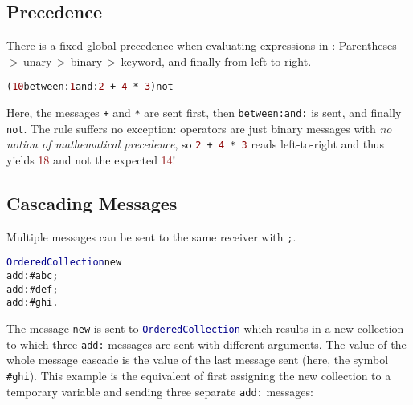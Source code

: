 \subsection{Precedence}

There is a fixed global precedence when evaluating expressions in \PH: Parentheses\,$>$\,unary\,$>$\,binary\,$>$\,keyword, and finally from left to right.

\begin{alltt}
(\textcolor{darkRed}{10} between: \textcolor{darkRed}{1} and: \textcolor{darkRed}{2}\,+\,\textcolor{darkRed}{4}\,*\,\textcolor{darkRed}{3}) not
\end{alltt}

Here, the messages \texttt{+} and \texttt{*} are sent first, then \texttt{between:and:} is sent, and finally \texttt{not}.
The rule suffers no exception: operators are just binary messages with \emph{no notion of mathematical precedence}, so \texttt{\textcolor{darkRed}{2}\,+\,\textcolor{darkRed}{4}\,*\,\textcolor{darkRed}{3}} reads left-to-right and thus yields \textcolor{darkRed}{18} and not the expected \textcolor{darkRed}{14}!

\subsection{Cascading Messages}

Multiple messages can be sent to the same receiver with \texttt{;}.

\begin{alltt}
\textcolor{darkBlue}{OrderedCollection} new
  add: \textcolor{string}{#abc};
  add: \textcolor{string}{#def};
  add: \textcolor{string}{#ghi}.
\end{alltt}

The message \texttt{new} is sent to \texttt{\textcolor{darkBlue}{OrderedCollection}} which
results in a new collection to which three \texttt{add:} messages are sent with different arguments.
The value of the whole message cascade is the value of the last message sent (here, the symbol \textcolor{string}{\texttt{\#ghi}}).
This example is the equivalent of first assigning the new collection to a temporary variable and sending three separate \texttt{add:} messages:

